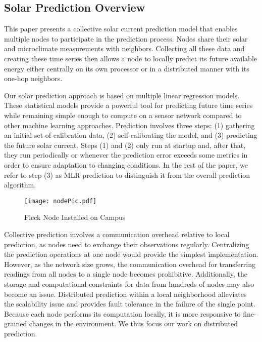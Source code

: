 \documentclass[prodmode,acmtosn]{acmsmall}
\begin{document}
\subsection{Solar Prediction Overview}
This paper presents a collective solar current prediction model that enables multiple nodes to participate in the prediction process.  Nodes share their solar and microclimate measurements with neighbors.
Collecting all these data and creating these time series then allows a node to locally predict its future available energy either centrally on its own processor or in a distributed manner with its one-hop neighbors.

Our solar prediction approach is based on multiple linear regression models.
These statistical models provide a powerful tool for predicting future time series while remaining simple enough to compute on a sensor network compared to other machine learning approaches.
Prediction involves three steps: (1) gathering an initial set of calibration data, (2) self-calibrating the model, and (3)  predicting the future solar current.
Steps (1) and (2) only run at startup and, after that, they run periodically  or whenever the prediction error exceeds some metrics in order to ensure adaptation to changing conditions.
In the rest of the paper,  we refer to step (3) as MLR prediction to distinguish it from the overall prediction algorithm.

\begin{figure}
\begin{center}
\texttt{[image: nodePic.pdf]}
\end{center}
\vspace{-0.5cm}
\caption{Fleck Node Installed on Campus}
\vspace{-0.2cm}
\label{fig:node}
\end{figure}

Collective prediction involves a communication overhead relative to local prediction, as nodes need to exchange their observations regularly. Centralizing the prediction operations at one node would provide the simplest implementation. However, as the network size grows, the communication overhead for transferring readings from all nodes to a single node becomes prohibitive. Additionally, the storage and computational constraints for data from hundreds of nodes may also become an issue. Distributed prediction within a local neighborhood alleviates the scalability issue and provides fault tolerance in the failure of the single point. Because each node performs its computation locally, it is more responsive to fine-grained changes in the environment. We thus focus our work on distributed prediction. 
\end{document}
